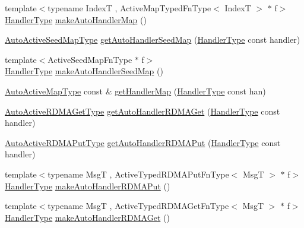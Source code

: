 \begin{DoxyCompactItemize}
\item 
{\footnotesize template$<$typename IndexT , Active\+Map\+Typed\+Fn\+Type$<$ Index\+T $>$ $\ast$ f$>$ }\\\hyperlink{namespacevt_af64846b57dfcaf104da3ef6967917573}{Handler\+Type} \hyperlink{namespacevt_1_1auto__registry_a07288f368e86daba0e0045a8e7bfda92}{make\+Auto\+Handler\+Map} ()
\item 
\hyperlink{namespacevt_1_1auto__registry_a9b5f3bdf0a9a503806cfd4f2747c82f6}{Auto\+Active\+Seed\+Map\+Type} \hyperlink{namespacevt_1_1auto__registry_a980b2e745c30944c6352bd6add8e585a}{get\+Auto\+Handler\+Seed\+Map} (\hyperlink{namespacevt_af64846b57dfcaf104da3ef6967917573}{Handler\+Type} const handler)
\item 
{\footnotesize template$<$Active\+Seed\+Map\+Fn\+Type $\ast$ f$>$ }\\\hyperlink{namespacevt_af64846b57dfcaf104da3ef6967917573}{Handler\+Type} \hyperlink{namespacevt_1_1auto__registry_a566748acf9e0867edadcf5e556b01b00}{make\+Auto\+Handler\+Seed\+Map} ()
\item 
\hyperlink{namespacevt_1_1auto__registry_ae1bc8f9afc86cc589761fbbf22064601}{Auto\+Active\+Map\+Type} const  \& \hyperlink{namespacevt_1_1auto__registry_a5969065f9c4ca94b47b3d896859d2cf9}{get\+Handler\+Map} (\hyperlink{namespacevt_af64846b57dfcaf104da3ef6967917573}{Handler\+Type} const han)
\item 
\hyperlink{namespacevt_1_1auto__registry_a039813f93a5804c77ae612e0318fb335}{Auto\+Active\+R\+D\+M\+A\+Get\+Type} \hyperlink{namespacevt_1_1auto__registry_a28f13a453b20fa9ccdfafaaab238bb65}{get\+Auto\+Handler\+R\+D\+M\+A\+Get} (\hyperlink{namespacevt_af64846b57dfcaf104da3ef6967917573}{Handler\+Type} const handler)
\item 
\hyperlink{namespacevt_1_1auto__registry_a1f67d3efa37b61040b56258ca59df088}{Auto\+Active\+R\+D\+M\+A\+Put\+Type} \hyperlink{namespacevt_1_1auto__registry_a56ae4569cdf3ba2d87a8e3caf0c706f9}{get\+Auto\+Handler\+R\+D\+M\+A\+Put} (\hyperlink{namespacevt_af64846b57dfcaf104da3ef6967917573}{Handler\+Type} const handler)
\item 
{\footnotesize template$<$typename MsgT , Active\+Typed\+R\+D\+M\+A\+Put\+Fn\+Type$<$ Msg\+T $>$ $\ast$ f$>$ }\\\hyperlink{namespacevt_af64846b57dfcaf104da3ef6967917573}{Handler\+Type} \hyperlink{namespacevt_1_1auto__registry_ab932bdb453695e6be54e2647dabd8c2a}{make\+Auto\+Handler\+R\+D\+M\+A\+Put} ()
\item 
{\footnotesize template$<$typename MsgT , Active\+Typed\+R\+D\+M\+A\+Get\+Fn\+Type$<$ Msg\+T $>$ $\ast$ f$>$ }\\\hyperlink{namespacevt_af64846b57dfcaf104da3ef6967917573}{Handler\+Type} \hyperlink{namespacevt_1_1auto__registry_a4ae7737d1cfa28838af83f35778dc46f}{make\+Auto\+Handler\+R\+D\+M\+A\+Get} ()

\end{DoxyCompactItemize}
